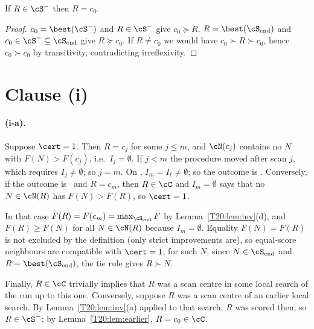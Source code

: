 \documentclass[11pt]{report}
\begin{document}
\begin{T20lemma}\label{T20:lem:earlier}
If $R\in\cS^-$ then $R=c_0$.
\end{T20lemma}
\begin{proof}
$c_0=\best(\cS^-)$ and $R\in\cS^-$ give $c_0\succeq R$. $R=\best(\cS_{\rm end})$ and $c_0\in\cS^-\subseteq\cS_{\rm end}$ give $R\succeq c_0$. If $R\ne c_0$ we would have $c_0\succ R\succ c_0$, hence $c_0\succ c_0$ by transitivity, contradicting irreflexivity.
\end{proof}

\section{Clause (i)}

\paragraph{(i-a).}
Suppose $\cert=1$. Then $R=c_j$ for some $j\le m$, and $\cN(c_j)$ contains no $N$ with $F(N)>F(c_j)$, i.e.\ $I_j=\emptyset$. If $j<m$ the procedure moved after scan $j$, which requires $I_j\ne\emptyset$; so $j=m$. On \LIMIT, $I_m=I_\ell\ne\emptyset$; so the outcome is \NOIMP. Conversely, if the outcome is \NOIMP\ and $R=c_m$, then $R\in\cC$ and $I_m=\emptyset$ says that no $N\in\cN(R)$ has $F(N)>F(R)$, so $\cert=1$.

In that case $F(R)=F(c_m)=\max_{\cS_{\rm end}}F$ by Lemma~\ref{T20:lem:inv}(d), and $F(R)\ge F(N)$ for all $N\in\cN(R)$ because $I_m=\emptyset$. Equality $F(N)=F(R)$ is not excluded by the definition (only strict improvements are), so equal-score neighbours are compatible with $\cert=1$; for such $N$, since $N\in\cS_{\rm end}$ and $R=\best(\cS_{\rm end})$, the tie rule gives $R\succ N$.

Finally, $R\in\cC$ trivially implies that $R$ was a scan centre in some local search of the run up to this one. Conversely, suppose $R$ was a scan centre of an earlier local search. By Lemma~\ref{T20:lem:inv}(a) applied to that search, $R$ was scored then, so $R\in\cS^-$; by Lemma~\ref{T20:lem:earlier}, $R=c_0\in\cC$.
\end{document}
